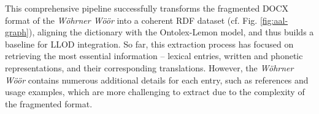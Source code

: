 This comprehensive pipeline successfully transforms the fragmented DOCX format of the \emph{Wöhrner Wöör} into a coherent RDF dataset (cf. Fig. \ref{fig:aal-graph}), aligning the dictionary with the Ontolex-Lemon model, and thus builds a baseline for LLOD integration. So far, this extraction process has focused on retrieving the most essential information -- lexical entries, written and phonetic representations, and their corresponding translations. However, the \emph{Wöhrner Wöör} contains numerous additional details for each entry, such as references and usage examples, which are more challenging to extract due to the complexity of the fragmented format.





%
%
%

